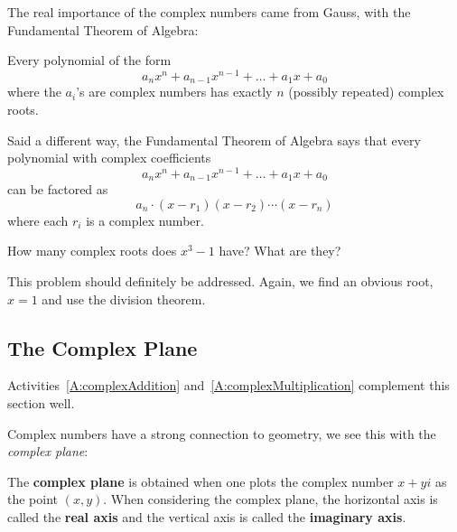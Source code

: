 The real importance of the complex numbers came from
Gauss, with the Fundamental Theorem of Algebra:

\begin{theorem}
 Every polynomial of the form
\[
 a_n x^n + a_{n-1} x^{n-1} + \dots + a_1 x + a_0
\]
where the $a_i$'s are complex numbers has exactly $n$ (possibly
repeated) complex roots.
\end{theorem}

Said a different way, the Fundamental Theorem of Algebra says that
every polynomial with complex coefficients
\[
a_n x^n + a_{n-1} x^{n-1} + \dots + a_1 x + a_0
\]
can be factored as 
\[
a_n\cdot (x-r_1)(x-r_2) \cdots (x-r_n)
\]
where each $r_i$ is a complex number.

\begin{question} 
How many complex roots does $x^3-1$ have? What are they?
\end{question}
\QM

\begin{teachingnote}
This problem should definitely be addressed. Again, we find an
obvious root, $x=1$ and use the division theorem.
\end{teachingnote}



\subsection{The Complex Plane}


\begin{teachingnote}
Activities~\ref{A:complexAddition} and~\ref{A:complexMultiplication}
complement this section well.
\end{teachingnote}

Complex numbers have a strong connection to geometry, we see this with
the \textit{complex plane}:

\begin{definition}
The \textbf{complex plane} is obtained when one
plots the complex number $x + yi$ as the point $(x,y)$. When
considering the complex plane, the horizontal axis is called the
\textbf{real axis} and the vertical axis is called the
\textbf{imaginary axis}.
\end{definition}

